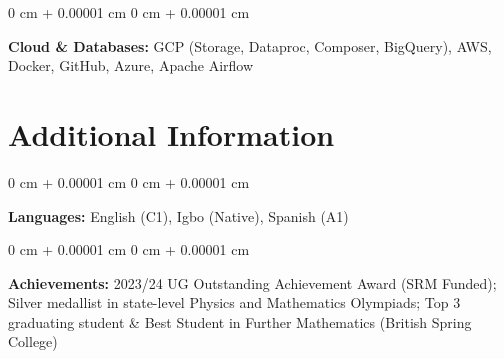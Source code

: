 \documentclass[10pt, a4paper]{article}
\newenvironment{onecolentry}{
    \begin{adjustwidth}{
        0 cm + 0.00001 cm
    }{
        0 cm + 0.00001 cm
    }
}{
    \end{adjustwidth}
} %
\begin{document}
    \begin{onecolentry}
        \textbf{Cloud \& Databases:} GCP (Storage, Dataproc, Composer, BigQuery), AWS, Docker, GitHub, Azure,  Apache Airflow
    \end{onecolentry}

    \vspace{0.2 cm}

    \section{Additional Information}

    \begin{onecolentry}
        \textbf{Languages:} English (C1), Igbo (Native), Spanish (A1)
    \end{onecolentry}

    \vspace{0.1 cm}



    \begin{onecolentry}
        \textbf{Achievements:} 2023/24 UG Outstanding Achievement Award (SRM Funded); Silver medallist in state-level Physics and Mathematics Olympiads; Top 3 graduating student \& Best Student in Further Mathematics (British Spring College)
    \end{onecolentry}

    \vspace{0.2 cm}
\end{document}
